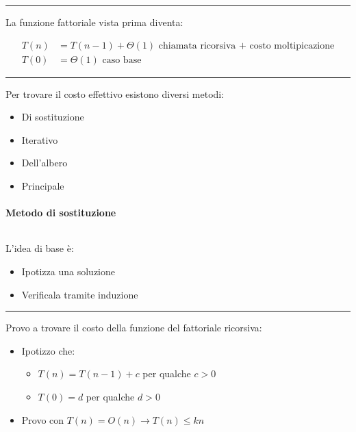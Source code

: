 \documentclass{article}
\begin{document}
\noindent\rule{\textwidth}{0.5pt}\newline

\noindent La funzione fattoriale vista prima diventa:

\begin{equation}
    \nonumber
    \begin{split}
        T(n) & =T(n-1)+\Theta(1)\text{ chiamata ricorsiva + costo moltipicazione}\\
        T(0) & =\Theta(1)\text{ caso base}
    \end{split}
\end{equation}

\noindent\rule{\textwidth}{0.5pt}\newline

\noindent Per trovare il costo effettivo esistono diversi metodi:
\begin{itemize}
    \item Di sostituzione
    \item Iterativo
    \item Dell'albero
    \item Principale\newline
\end{itemize}

\paragraph{Metodo di sostituzione} $\ $\newline

\noindent L'idea di base è:
\begin{itemize}
    \item Ipotizza una soluzione
    \item Verificala tramite induzione\newline
\end{itemize}

\noindent\rule{\textwidth}{0.5pt}\newline

\noindent Provo a trovare il costo della funzione del fattoriale ricorsiva:
\begin{itemize}
    \item Ipotizzo che:
    \begin{itemize}
        \item $T(n)=T(n-1)+c$ per qualche $c>0$
        \item $T(0)=d$ per qualche $d>0$
    \end{itemize}

    \item Provo con $T(n)=O(n)\rightarrow T(n)\leq kn$\newline
    
\end{itemize}
\end{document}
